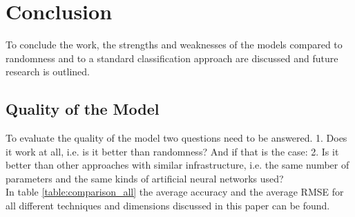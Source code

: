 
\chapter{Conclusion}
\label{chap:Conclusion}

To conclude the work, the strengths and weaknesses of the models compared to randomness and to a standard classification approach are discussed and future research is outlined. 

\section{Quality of the Model}

To evaluate the quality of the model two questions need to be answered. 1. Does it work at all, i.e. is it better than randomness? And if that is the case: 2. Is it better than other approaches with similar infrastructure, i.e. the same number of parameters and the same kinds of artificial neural networks used?\\
In table \ref{table:comparison_all} the average accuracy and the average RMSE for all different techniques and dimensions discussed in this paper can be found. 

